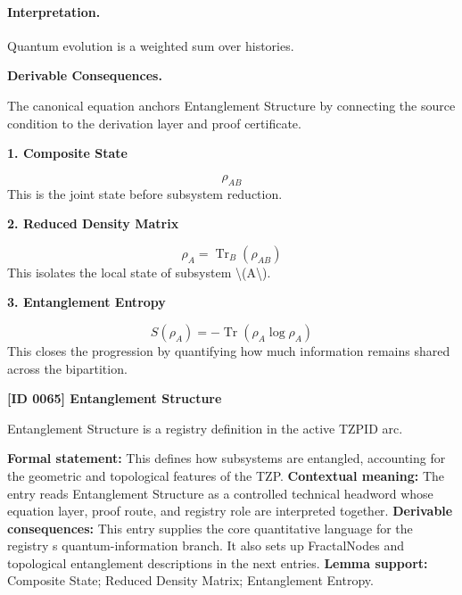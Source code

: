 \paragraph{Interpretation.}
Quantum evolution is a weighted sum over histories.

\par\vspace{0.35em}
\noindent\textbf{Derivable Consequences.}\quad
\begingroup
\footnotesize
\raggedright
The canonical equation anchors Entanglement Structure by connecting the source condition to the derivation layer and proof certificate.
\par\endgroup

\noindent\textbf{1. Composite State}\par
\[
\rho_{AB}
\]
\noindent This is the joint state before subsystem reduction.\par
\noindent\textbf{2. Reduced Density Matrix}\par
\[
\rho_{A} = \operatorname{Tr}_{B}(\rho_{AB})
\]
\noindent This isolates the local state of subsystem \textbackslash{}(A\textbackslash{}).\par
\noindent\textbf{3. Entanglement Entropy}\par
\[
S(\rho_{A})
=
-\operatorname{Tr}\!\left(\rho_{A}\log\rho_{A}\right)
\]
\noindent This closes the progression by quantifying how much information remains shared across the bipartition.\par

\clearpage
\noindent\textbf{[ID 0065] Entanglement Structure}\par
\vspace{0.35em}
\begingroup\small
{}
Entanglement Structure is a registry definition in the active TZPID arc.

\begingroup\footnotesize\setlength{\emergencystretch}{3em}\sloppy
\textbf{Formal statement:} This defines how subsystems are entangled, accounting for the geometric and topological features of the TZP. \textbf{Contextual meaning:} The entry reads Entanglement Structure as a controlled technical headword whose equation layer, proof route, and registry role are interpreted together. \textbf{Derivable consequences:} This entry supplies the core quantitative language for the registry s quantum-information branch. It also sets up FractalNodes and topological entanglement descriptions in the next entries. \textbf{Lemma support:} Composite State; Reduced Density Matrix; Entanglement Entropy.\par
\endgroup

